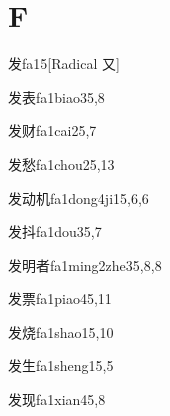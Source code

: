 
\section*{F}

\begin{verbete}{发}{fa1}{5}[Radical ⼜]
\end{verbete}

\begin{verbete}{发表}{fa1biao3}{5,8}
\end{verbete}

\begin{verbete}{发财}{fa1cai2}{5,7}
\end{verbete}

\begin{verbete}{发愁}{fa1chou2}{5,13}
\end{verbete}

\begin{verbete}{发动机}{fa1dong4ji1}{5,6,6}
\end{verbete}

\begin{verbete}{发抖}{fa1dou3}{5,7}
\end{verbete}

\begin{verbete}{发明者}{fa1ming2zhe3}{5,8,8}
\end{verbete}

\begin{verbete}{发票}{fa1piao4}{5,11}
\end{verbete}

\begin{verbete}{发烧}{fa1shao1}{5,10}
\end{verbete}

\begin{verbete}{发生}{fa1sheng1}{5,5}
\end{verbete}

\begin{verbete}{发现}{fa1xian4}{5,8}
\end{verbete}

